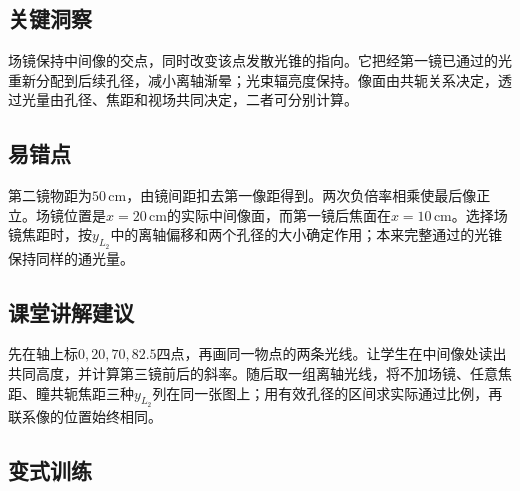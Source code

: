 \documentclass[UTF8,fontset=fandol,a4paper,11pt]{ctexart}
\begin{document}

\subsection*{关键洞察}

场镜保持中间像的交点，同时改变该点发散光锥的指向。它把经第一镜已通过的光重新分配到后续孔径，减小离轴渐晕；光束辐亮度保持。像面由共轭关系决定，透过光量由孔径、焦距和视场共同决定，二者可分别计算。



\subsection*{易错点}

第二镜物距为$50\,\mathrm{cm}$，由镜间距扣去第一像距得到。两次负倍率相乘使最后像正立。场镜位置是$x=20\,\mathrm{cm}$的实际中间像面，而第一镜后焦面在$x=10\,\mathrm{cm}$。选择场镜焦距时，按$y_{L_2}$中的离轴偏移和两个孔径的大小确定作用；本来完整通过的光锥保持同样的通光量。



\subsection*{课堂讲解建议}

先在轴上标$0,20,70,82.5$四点，再画同一物点的两条光线。让学生在中间像处读出共同高度，并计算第三镜前后的斜率。随后取一组离轴光线，将不加场镜、任意焦距、瞳共轭焦距三种$y_{L_2}$列在同一张图上；用有效孔径的区间求实际通过比例，再联系像的位置始终相同。



\subsection*{变式训练}
\end{document}
